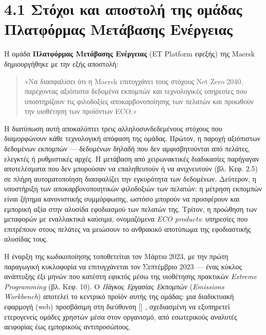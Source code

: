 \documentclass[11pt,a4paper,greek,twoside]{template-xe}
\let\origtexttt\texttt
\renewcommand{\texttt}[1]{%
  \begingroup
  \StrSubstitute{#1}{.}{.\allowbreak}[\tttmp]%
  \origtexttt{\tttmp}%
  \endgroup
}
\begin{document}
\section{4.1 Στόχοι και αποστολή της ομάδας Πλατφόρμας Μετάβασης
Ενέργειας}\label{ux3c3ux3c4ux3ccux3c7ux3bfux3b9-ux3baux3b1ux3b9-ux3b1ux3c0ux3bfux3c3ux3c4ux3bfux3bbux3ae-ux3c4ux3b7ux3c2-ux3bfux3bcux3acux3b4ux3b1ux3c2-ux3c0ux3bbux3b1ux3c4ux3c6ux3ccux3c1ux3bcux3b1ux3c2-ux3bcux3b5ux3c4ux3acux3b2ux3b1ux3c3ux3b7ux3c2-ux3b5ux3bdux3adux3c1ux3b3ux3b5ux3b9ux3b1ux3c2}

Η ομάδα \textbf{Πλατφόρμας Μετάβασης Ενέργειας} (ET Platform εφεξής) της
Maersk δημιουργήθηκε με την εξής αποστολή:

\begin{quote}
«Να διασφαλίσει ότι η Maersk επιτυγχάνει τους στόχους Net Zero 2040,
παρέχοντας αξιόπιστα δεδομένα εκπομπών και τεχνολογικές υπηρεσίες που
υποστηρίζουν τις φιλοδοξίες αποκαρβονοποίησης των πελατών και προωθούν
την υιοθέτηση των προϊόντων ECO.»
\end{quote}

Η διατύπωση αυτή αποκαλύπτει τρεις αλληλοσυνδεδεμένους στόχους που
διαμορφώνουν κάθε τεχνολογική απόφαση της ομάδας. Πρώτον, η παροχή
αξιόπιστων δεδομένων εκπομπών --- δεδομένων δηλαδή που δεν
αμφισβητούνται από πελάτες, ελεγκτές ή ρυθμιστικές αρχές. Η μετάβαση από
χειρωνακτικές διαδικασίες παρήγαγαν αποτελέσματα που δεν μπορούσαν να
επαληθευτούν ή να ανιχνευτούν (βλ. Κεφ. 2.5) σε πλήρη αυτοματοποίηση
διασφαλίζει την εγκυρότητα των δεδομένων. Δεύτερον, η υποστήριξη των
αποκαρβονοποιητικών φιλοδοξιών των πελατών: η μέτρηση εκπομπών είναι
ζήτημα κανονιστικής συμμόρφωσης, ωστόσο μπορούν να προσφέρουν και
εμπορική αξία στην αλυσίδα εφοδιασμού των πελατών της. Τρίτον, η
προώθηση των μεταφορών με εναλλακτικά καύσιμα, ονομαζόμενα \emph{ECO
products}: υπηρεσίες που επιτρέπουν στους πελάτες να μειώσουν το
ανθρακικό αποτύπωμα της εφοδιαστικής αλυσίδας τους.

Η έναρξη της κωδικοποίησης τοποθετείται τον Μάρτιο 2023, με την πρώτη
παραγωγική κυκλοφορία να επιτυγχάνεται τον Σεπτέμβριο 2023 --- ένας
κύκλος ανάπτυξης έξι μηνών που κατέστη εφικτός μέσω της υιοθέτησης
πρακτικών \emph{Extreme Programming} (βλ. Κεφ. 10). Ο \emph{Πάγκος
Εργασίας Εκπομπών} (\emph{Emissions Workbench}) αποτελεί το κεντρικό
προϊόν αυτής της ομάδας: μια διαδικτυακή εφαρμογή (web) προσβάσιμη στη
διεύθυνση \texttt{emissions-workbench.maersk.com}, σχεδιασμένη να
εξυπηρετεί ετερογενείς ομάδες χρηστών μέσα στον οργανισμό, από
εσωτερικούς αναλυτές αειφορίας έως εμπορικούς αντιπροσώπους.
\end{document}
